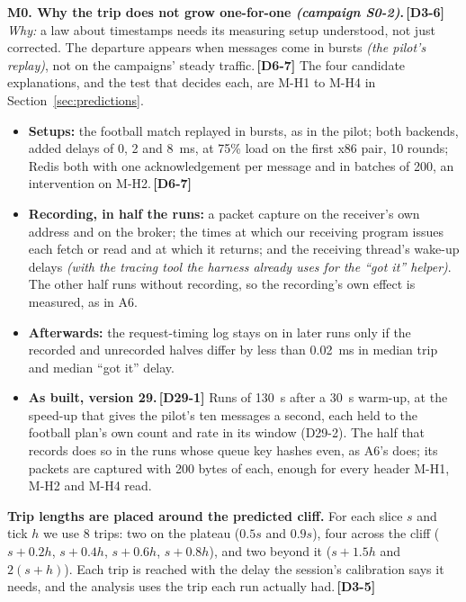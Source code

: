 \documentclass[11pt]{article}
\newcommand{\gl}[1]{{\color{soft}\itshape\small (#1)}}
\newcommand{\chg}[1]{\,{\color{chgcol}\bfseries\footnotesize[#1]}}
\newcommand{\chgold}[1]{\,{\color{oldcol}\bfseries\footnotesize[#1]}}
\begin{document}
\textbf{M0. Why the trip does not grow one-for-one \gl{campaign S0-2}.}\chgold{D3-6} \emph{Why:} a law about timestamps needs its measuring setup understood, not just corrected. The departure appears when messages come in bursts \gl{the pilot's replay}, not on the campaigns' steady traffic.\chgold{D6-7} The four candidate explanations, and the test that decides each, are M-H1 to M-H4 in Section~\ref{sec:predictions}.
\begin{itemize}
  \item \textbf{Setups:} the football match replayed in bursts, as in the pilot; both backends, added delays of 0, 2 and 8~ms, at 75\% load on the first x86 pair, 10 rounds; Redis both with one acknowledgement per message and in batches of 200, an intervention on M-H2.\chgold{D6-7}
  \item \textbf{Recording, in half the runs:} a packet capture on the receiver's own address and on the broker; the times at which our receiving program issues each fetch or read and at which it returns; and the receiving thread's wake-up delays \gl{with the tracing tool the harness already uses for the ``got it'' helper}. The other half runs without recording, so the recording's own effect is measured, as in A6.
  \item \textbf{Afterwards:} the request-timing log stays on in later runs only if the recorded and unrecorded halves differ by less than 0.02~ms in median trip and median ``got it'' delay.
  \item \textbf{As built, version 29.}\chg{D29-1} Runs of 130~s after a 30~s warm-up, at the speed-up that gives the pilot's ten messages a second, each held to the football plan's own count and rate in its window (D29-2). The half that records does so in the runs whose queue key hashes even, as A6's does; its packets are captured with 200 bytes of each, enough for every header M-H1, M-H2 and M-H4 read.
\end{itemize}

\textbf{Trip lengths are placed around the predicted cliff.} For each slice $s$ and tick $h$ we use 8 trips: two on the plateau ($0.5s$ and $0.9s$), four across the cliff ($s + 0.2h$, $s + 0.4h$, $s + 0.6h$, $s + 0.8h$), and two beyond it ($s + 1.5h$ and $2(s + h)$). Each trip is reached with the delay the session's calibration says it needs, and the analysis uses the trip each run actually had.\chgold{D3-5}
\end{document}

